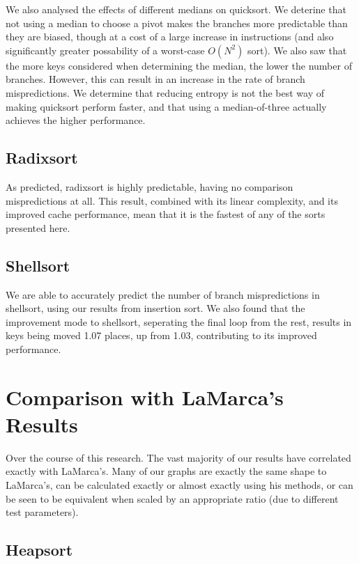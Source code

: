 We also analysed the effects of different medians on quicksort. We deterine that
not using a median to choose a pivot makes the branches more predictable than
they are biased, though at a cost of a large increase in instructions (and also
significantly greater possability of a worst-case $O(N^2)$ sort). We also saw
that the more keys considered when determining the median, the lower the number
of branches. However, this can result in an increase in the rate of branch
mispredictions. We determine that reducing entropy is not the best way of making
quicksort perform faster, and that using a median-of-three actually achieves the
higher performance.

\subsection{Radixsort}

As predicted, radixsort is highly predictable, having no comparison
mispredictions at all. This result, combined with its linear complexity, and its
improved cache performance, mean that it is the fastest of any of the sorts
presented here.

\subsection{Shellsort}

We are able to accurately predict the number of branch mispredictions in
shellsort, using our results from insertion sort. We also found that the
improvement mode to shellsort, seperating the final loop from the rest, results
in keys being moved 1.07 places, up from 1.03, contributing to its improved
performance.

\section{Comparison with LaMarca's Results}

Over the course of this research. The vast majority of our results have
correlated exactly with LaMarca's. Many of our graphs are exactly the same
shape to LaMarca's, can be calculated exactly or almost exactly using his
methods, or can be seen to be equivalent when scaled by an appropriate ratio
(due to different test parameters).

\subsection{Heapsort}

